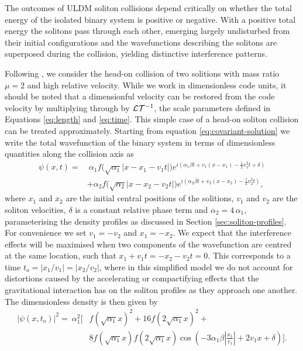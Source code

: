 \documentclass[a4paper,11pt]{article}
\begin{document}
The outcomes of ULDM soliton collisions depend critically on  whether the total energy of the isolated binary system is positive or negative. With a positive total energy the solitons pass through each other, emerging largely undisturbed from their initial configurations and the wavefunctions describing the solitons are superposed during the collision, yielding distinctive interference patterns. 

Following \cite{Schwabe:2016rze}, we consider the head-on collision of two solitions with mass ratio $\mu=2$ and high relative velocity. While we work in dimensionless code units, it should be noted that a dimensionful velocity can be restored from the code velocity by multiplying through by $\CMcal{L}\CMcal{T}^{-1}$, the scale parameters defined in Equations \ref{eq:length} and \ref{eq:time}. This simple case of a head-on soliton collision can be treated approximately. Starting from equation \ref{eq:covariant-solution} we write the total wavefunction of the binary system in terms of dimensionless quantities along the collision axis as
\begin{align}
    \psi(x,t)=& \ \alpha_1 f\big(\sqrt{\alpha_1}\vert x-x_1-v_1 t\vert\big)e^{i\left(\alpha_1\beta t+v_1(x-x_1)-\frac{1}{2}v_1^2 t+\delta\right)}\nonumber\\
    &+\alpha_2 f\big(\sqrt{\alpha_2}\vert x-x_2-v_2 t\vert\big)e^{i\left(\alpha_2\beta t+v_2(x-x_2)-\frac{1}{2}v_2^2 t\right)},
\end{align}
where $x_1$ and $x_2$ are the initial central positions of the solitions, $v_1$ and $v_2$ are the soliton velocities, $\delta$ is a constant relative phase term and $\alpha_2 = 4\, \alpha_1$, parameterising the density profiles as discussed in Section \ref{sec:soliton-profiles}. For convenience we set $v_1=-v_2$ and $x_1=-x_2$. We expect that the interference effects will be maximised when two components of the wavefunction are centred at the same location, such that $x_1+v_1t=-x_2-v_2t=0$. This corresponds to a time $t_{o}=\vert x_1/v_1\vert = \vert x_2/v_2\vert$, where in this simplified model we do not account for distortions caused by the accelerating or compactifying effects that the gravitational interaction has on the soliton profiles as they approach one another. The dimensionless density is then given by
\begin{align}\label{eq:predicted-interference}
    \vert\psi(x,t_{o})\vert^2= \ \alpha_1^2\bigg[&f(\sqrt{\alpha_1}x)^2+16f(2\sqrt{\alpha_1}x)^2+\nonumber\\
    &8f(\sqrt{\alpha_1}x)f(2\sqrt{\alpha_1}x)\operatorname{cos}\left(-3\alpha_1\beta\left\vert\frac{x_1}{v_1}\right\vert+2v_1x+\delta \right)\bigg].
\end{align}
\end{document}
